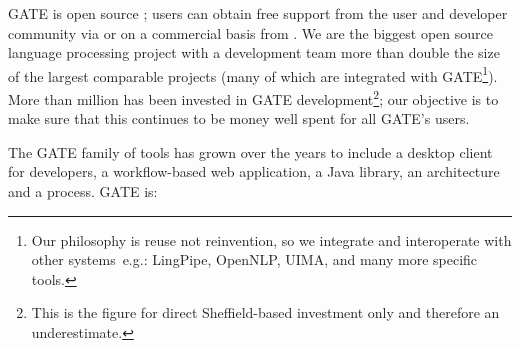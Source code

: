 GATE is open source ; users
can obtain free support from the user and developer community
via  or on a commercial basis
from . We are the
biggest open source language processing project with a development
team more than double the size of the largest comparable projects
(many of which are integrated with GATE\footnote{Our philosophy is
reuse not reinvention, so we integrate and interoperate with other
systems\, e.g.: LingPipe, OpenNLP, UIMA, and many more specific
tools.}). More than  million has been invested in GATE
development\footnote{This is the figure for direct Sheffield-based
investment only and therefore an underestimate.}; our objective is to
make sure that this continues to be money well spent for all GATE's
users.

The GATE family of tools has grown over the years to include a desktop client for developers, a
workflow-based web application, a Java library, an architecture and a process.
GATE is:


